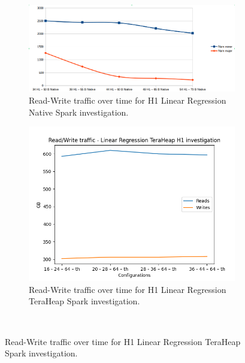 \begin{figure}[htbp]
\begin{subfigure}[b]{0.48\textwidth}
    \includegraphics[width=\linewidth]{./fig/rw_linr_h1_native.png}
    \caption{Read-Write traffic over time for H1 Linear Regression
    Native Spark investigation.}
    \label{fig:rw_linr_h1_native}
\end{subfigure}

\begin{subfigure}[b]{0.48\textwidth}
    \includegraphics[width=\linewidth]{./fig/rw_linr_h1_th.png}
    \caption{Read-Write traffic over time for H1 Linear Regression
    TeraHeap Spark investigation.}
    \label{fig:rw_linr_h1_th}
\end{subfigure}\\[1em]
\end{figure}

